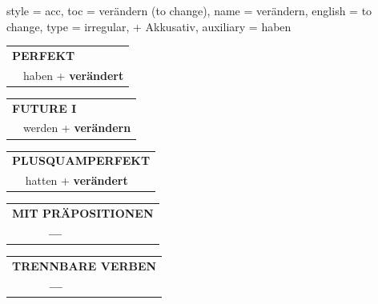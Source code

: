 \begin{verbentry}{
  style = {acc},
  toc = {verändern (to change)},
  name = {verändern},
  english = {to change},
  type = {irregular, + Akkusativ},
  auxiliary = {haben}
}
    \vspace{10pt}

 \begin{tabular}{rl}
     \multicolumn{2}{l}{\textbf{PERFEKT}}\\
  &  haben + \textbf{verändert}\\
  \end{tabular}
\hfill
   \begin{tabular}{rl}
   
    \multicolumn{2}{l}{\textbf{FUTURE I} }\\
  &  werden + \textbf{verändern}\\
 
  \end{tabular}
\hfill
   \begin{tabular}{rl}
      \multicolumn{2}{l}{\textbf{PLUSQUAMPERFEKT}}\\
   & hatten + \textbf{verändert}\\
  \end{tabular}
  
  
\vspace{10pt}

\begin{tabular}{lll}
\multicolumn{3}{l}{\textbf{MIT PRÄPOSITIONEN}}\\
& \textbf{---} & \\
\end{tabular}
\hfill
\begin{tabular}{lll}
\multicolumn{3}{l}{\textbf{TRENNBARE VERBEN}}\\
& \textbf{---} & \\
\end{tabular}
\vspace{-5pt}
\end{verbentry}

